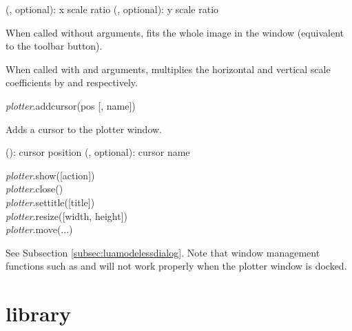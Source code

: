 \documentclass[a4paper,12pt,twoside,extrafontsizes]{memoir}
\begin{document}
\begin{funcparams}
	 (, optional): x scale ratio
	 (, optional): y scale ratio
\end{funcparams}

\begin{funcremarks}
	When called without arguments, fits the whole image in the window (equivalent to the  toolbar button).
	
	When called with  and  arguments, multiplies the horizontal and vertical scale coefficients by  and  respectively.
\end{funcremarks}


\begin{luafuncprototype}
\emph{plotter}.addcursor(pos [, name])
\end{luafuncprototype}

\begin{funcdescr}
	Adds a cursor to the plotter window.
\end{funcdescr}

\begin{funcparams}
	 (): cursor position
	 (, optional): cursor name
\end{funcparams}


\begin{luafuncprototype}
\emph{plotter}.show([action]) \\
\emph{plotter}.close() \\
\emph{plotter}.settitle([title]) \\
\emph{plotter}.resize([width, height]) \\
\emph{plotter}.move(...)
\end{luafuncprototype}

\begin{funcdescr}
	See Subsection \ref{subsec:luamodelessdialog}. Note that window management functions such as  and  will not work properly when the plotter window is docked.
\end{funcdescr}

\section[codec library]{ library}
\end{document}
